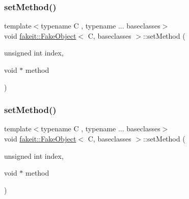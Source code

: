\subsubsection{\texorpdfstring{setMethod()}{setMethod()}\hspace{0.1cm}{\footnotesize\ttfamily [4/9]}}
{\footnotesize\ttfamily template$<$typename C , typename ... baseclasses$>$ \\
void \mbox{\hyperlink{classfakeit_1_1FakeObject}{fakeit\+::\+Fake\+Object}}$<$ C, baseclasses $>$\+::set\+Method (\begin{DoxyParamCaption}\item[{unsigned int}]{index,  }\item[{void $\ast$}]{method }\end{DoxyParamCaption})\hspace{0.3cm}{\ttfamily [inline]}}

\mbox{\label{classfakeit_1_1FakeObject_ad05ea03dec6dc302d6d7b62e47bd1219}} 
\subsubsection{\texorpdfstring{setMethod()}{setMethod()}\hspace{0.1cm}{\footnotesize\ttfamily [5/9]}}
{\footnotesize\ttfamily template$<$typename C , typename ... baseclasses$>$ \\
void \mbox{\hyperlink{classfakeit_1_1FakeObject}{fakeit\+::\+Fake\+Object}}$<$ C, baseclasses $>$\+::set\+Method (\begin{DoxyParamCaption}\item[{unsigned int}]{index,  }\item[{void $\ast$}]{method }\end{DoxyParamCaption})\hspace{0.3cm}{\ttfamily [inline]}}

\mbox{\label{classfakeit_1_1FakeObject_ad05ea03dec6dc302d6d7b62e47bd1219}} 

